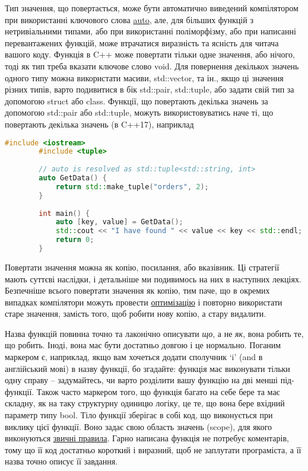 \documentclass[12pt]{article}
\begin{document}
	Тип значення, що повертається, може бути автоматично виведений компілятором при використанні ключового слова \href{https://en.cppreference.com/w/cpp/language/auto}{auto}, але, для більших функцій з нетривіальними типами, або при використанні поліморфізму, або при написанні перевантажених функцій, може втрачатися виразність та ясність для читача вашого коду. Функція в C++ може повертати тільки одне значення, або нічого, тоді як тип треба вказати ключове слово void. Для повернення декількох значень одного типу можна використати масиви, std::vector, та ін., якщо ці значення різних типів, варто подивитися в бік std::pair, std::tuple, або задати свій тип за допомогою struct або class. Функції, що повертають декілька значень за допомогою std::pair або std::tuple, можуть використовуватись наче ті, що повертають декілька значень (в C++17), наприклад
	\begin{lstlisting}[language=c++]
		#include <iostream> 
		#include <tuple> 
		
		// auto is resolved as std::tuple<std::string, int>
		auto GetData() {
			return std::make_tuple("orders", 2); 
		}
		
		int main() {
			auto [key, value] = GetData();
			std::cout << "I have found " << value << key << std::endl;
			return 0; 
		}
	\end{lstlisting}
	Повертати значення можна як копію, посилання, або вказівник. Ці стратегії мають суттєві наслідки, і детальніше ми подивимось на них в наступних лекціях. Безпечніше всього повертати значення як копію, тим паче, що в окремих випадках компілятори можуть провести \href{https://en.wikipedia.org/wiki/Copy_elision#Return_value_optimization}{оптимізацію} і повторно використати старе значення, замість того, щоб робити нову копію, а стару видалити.
	
	Назва функцій повинна точно та лаконічно описувати \textit{що}, а не \textit{як}, вона робить те, що робить. Іноді, вона має бути достатньо довгою і це нормально. Поганим маркером є, наприклад, якщо вам хочеться додати сполучник `i' (and в англійський мові) в назву функції, бо згадайте: функція має виконувати тільки одну справу -- задумайтесь, чи варто розділити вашу функцію на дві менші під-функції. Також часто маркером того, що функція багато на себе бере та має складну, як на таку структурну одиницю логіку, це те, що вона бере вхідний параметр типу bool. Тіло функції зберігає в собі код, що виконується при виклику цієї функції. Воно задає свою область значень (scope), для якого виконуються \href{https://en.cppreference.com/w/cpp/language/scope}{звичні правила}. Гарно написана функція не потребує коментарів, тому що її код достатньо короткий і виразний, щоб не заплутати програміста, а її назва точно описує її завдання. 
\end{document}
